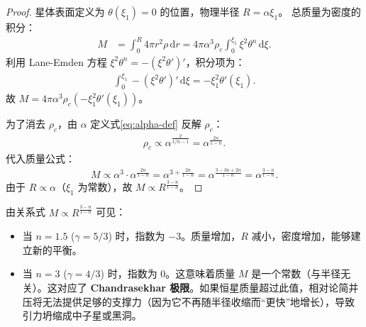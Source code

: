 \begin{proof}
    星体表面定义为 $\theta(\xi_1)=0$ 的位置，物理半径 $R = \alpha \xi_1$。
    总质量为密度的积分：
    \begin{align}
    M &= \int_0^R 4\pi r^2 \rho \,\mathrm{d}r 
    = 4\pi \alpha^3 \rho_c \int_0^{\xi_1} \xi^2 \theta^n \,\mathrm{d}\xi.
    \end{align}
    利用 Lane-Emden 方程 $\xi^2 \theta^n = -(\xi^2 \theta')'$，积分项为：
    \begin{align}
    \int_0^{\xi_1} -(\xi^2 \theta')' \,\mathrm{d}\xi = -\xi_1^2 \theta'(\xi_1).
    \end{align}
    故 $M = 4\pi \alpha^3 \rho_c (-\xi_1^2 \theta'(\xi_1))$。
    
    为了消去 $\rho_c$，由 $\alpha$ 定义式\eqref{eq:alpha-def} 反解 $\rho_c$：
    \begin{align}
    \rho_c \propto \alpha^{\frac{2}{1/n-1}} = \alpha^{\frac{2n}{1-n}}.
    \end{align}
    代入质量公式：
    \begin{align}
    M \propto \alpha^3 \cdot \alpha^{\frac{2n}{1-n}} = \alpha^{3 + \frac{2n}{1-n}} = \alpha^{\frac{3-3n+2n}{1-n}} = \alpha^{\frac{3-n}{1-n}}.
    \end{align}
    由于 $R \propto \alpha$（$\xi_1$ 为常数），故 $M \propto R^{\frac{3-n}{1-n}}$。
\end{proof}

\begin{derivationnote}
    由关系式 $M \propto R^{\frac{3-n}{1-n}}$ 可见：
    \begin{itemize}
        \item 当 $n=1.5$ ($\gamma=5/3$) 时，指数为 $-3$。质量增加，$R$ 减小，密度增加，能够建立新的平衡。
        \item 当 $n=3$ ($\gamma=4/3$) 时，指数为 $0$。这意味着质量 $M$ 是一个常数（与半径无关）。这对应了 \textbf{Chandrasekhar 极限}。如果恒星质量超过此值，相对论简并压将无法提供足够的支撑力（因为它不再随半径收缩而“更快”地增长），导致引力坍缩成中子星或黑洞。
    \end{itemize}
\end{derivationnote}

